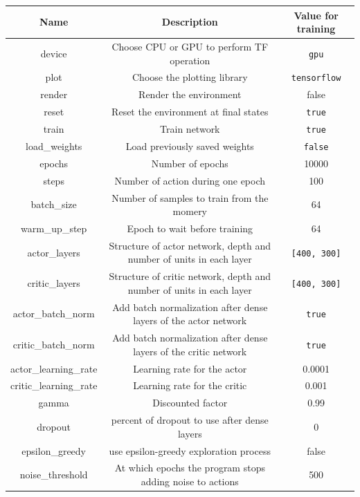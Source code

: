 \documentclass{article}
\begin{document}
\begin{table}[ht]
  \centering
  \begin{adjustbox}{width=1\textwidth}
    \begin{tabular}{ |c|c|c| }
      \hline
      \textbf{Name} & \textbf{Description} & \textbf{Value for training} \\
      \hline
      device & Choose CPU or GPU to perform TF operation & \verb?gpu? \\
      plot & Choose the plotting library & \verb?tensorflow? \\
      render & Render the environment\footnotemark & false \\
      reset & Reset the environment at final states & \verb?true? \\ 
      train & Train network & \verb?true? \\
      load\_weights & Load previously saved weights & \verb?false? \\
      epochs & Number of epochs & 10000 \\
      steps & Number of action during one epoch & 100 \\ 
      batch\_size & Number of samples to train from the momery & 64 \\
      warm\_up\_step & Epoch to wait before training & 64 \\
      actor\_layers & Structure of actor network, depth and number of units in each layer & \verb?[400, 300]? \\
      critic\_layers & Structure of critic network, depth and number of units in each layer & \verb?[400, 300]? \\
      actor\_batch\_norm & Add batch normalization after dense layers of the actor network & \verb?true? \\
      critic\_batch\_norm & Add batch normalization after dense layers of the critic network & \verb?true? \\
      actor\_learning\_rate & Learning rate for the actor & 0.0001 \\
      critic\_learning\_rate & Learning rate for the critic & 0.001 \\
      gamma & Discounted factor & 0.99 \\
      dropout & percent of dropout to use after dense layers & 0 \\
      epsilon\_greedy & use epsilon-greedy exploration process & false \\
      noise\_threshold & At which epochs the program stops adding noise to actions & 500 \\

\end{tabular}
\end{adjustbox}
\end{table}
\end{document}
